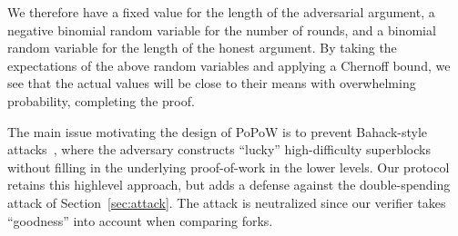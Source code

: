 We therefore have a fixed value for the length of the adversarial argument, a
negative binomial random variable for the number of rounds, and a binomial
random variable for the length of the honest argument. By taking the
expectations of the above random variables and applying a Chernoff bound, we see
that the actual values will be close to their means with overwhelming
probability, completing the proof.

The main issue motivating the design of PoPoW is to prevent Bahack-style
attacks~\cite{bahack}, where the adversary constructs ``lucky'' high-difficulty
superblocks without filling in the underlying proof-of-work in the lower
levels.
%
%
%
Our protocol retains this highlevel approach, but adds a defense against the double-spending attack of Section~\ref{sec:attack}. The attack is neutralized since our
verifier takes ``goodness'' into account when comparing forks.
